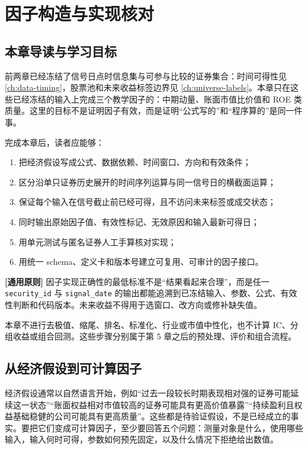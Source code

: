 \chapter{因子构造与实现核对}
\label{ch:factor-construction}

\section{本章导读与学习目标}

前两章已经冻结了信号日点时信息集与可参与比较的证券集合：时间可得性见 \cref{ch:data-timing}，股票池和未来收益标签边界见 \cref{ch:universe-labels}。本章只在这些已经冻结的输入上完成三个教学因子的：中期动量、账面市值比价值和 ROE 类质量。这里的目标不是证明因子有效，而是证明“公式写的”和“程序算的”是同一件事。

完成本章后，读者应能够：

\begin{enumerate}
  \item 把经济假设写成公式、数据依赖、时间窗口、方向和有效条件；
  \item 区分沿单只证券历史展开的时间序列运算与同一信号日的横截面运算；
  \item 保证每个输入在信号截止前已经可得，且不访问未来标签或成交状态；
  \item 同时输出原始因子值、有效性标记、无效原因和输入最新可得日；
  \item 用单元测试与匿名证券人工手算核对实现；
  \item 用统一 schema、定义卡和版本号建立可复用、可审计的因子接口。
\end{enumerate}

\begin{principlebox}
\textbf{[通用原则]} 因子实现正确性的最低标准不是“结果看起来合理”，而是任一 \texttt{security\_id} 与 \texttt{signal\_date} 的输出都能追溯到已冻结输入、参数、公式、有效性判断和代码版本。未来收益不得用于选窗口、改方向或修补缺失值。
\end{principlebox}

本章不进行去极值、缩尾、排名、标准化、行业或市值中性化，也不计算 IC、分组收益或组合回测。这些步骤分别属于第 5 章之后的预处理、评价和组合流程。

\section{从经济假设到可计算因子}

经济假设通常以自然语言开始，例如“过去一段较长时期表现相对强的证券可能延续这一状态”“账面权益相对市值较高的证券可能具有更高价值暴露”“持续盈利且权益基础稳健的公司可能具有更高质量”。这些都是待验证假设，不是已经成立的事实。要把它们变成可计算因子，至少要回答五个问题：测量对象是什么，使用哪些输入，输入何时可得，参数如何预先固定，以及什么情况下拒绝给出数值。


